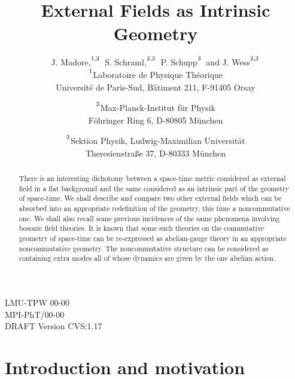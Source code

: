 \documentclass[a4paper,12pt]{article}
\newcommand{\initiate}{\setcounter{equation}{0}}
\begin{document}
 

\title{External Fields as Intrinsic Geometry}

\author{J. Madore,$\strut^{1,2}$\  S. Schraml,$\strut^{2,3}$\ 
        P. Schupp$\strut^{3}$\ and J. Wess$\strut^{2,3}$\\[15pt]
        $\strut^{1}$Laboratoire de Physique Th\'eorique\\
        Universit\'e de Paris-Sud, B\^atiment 211, F-91405 Orsay%
\and    $\strut^{2}$Max-Planck-Institut f\"ur Physik\\
        F\"ohringer Ring 6, D-80805 M\"unchen%
\and    $\strut^{3}$Sektion Physik, Ludwig-Maximilian Universit\"at\\
        Theresienstra\ss e 37, D-80333 M\"unchen}

\date{}

\maketitle

\begin{abstract}
There is an interesting dichotomy between a space-time
metric considered as external field in a flat background and the
same considered as an intrinsic part of the geometry of space-time. 
We shall describe and compare two other external
fields which can be absorbed into an appropriate redefinition of the
geometry, this time a noncommutative one. We shall also recall some
previous incidences of the same phenomena involving bosonic field
theories. It is known that some such theories on the commutative
geometry of space-time can be re-expressed as abelian-gauge theory
in an appropriate noncommutative geometry. The noncommutative
structure can be considered as containing extra modes all of whose
dynamics are given by the one abelian action. 
\end{abstract}

\vfill
\noindent
LMU-TPW 00-00\\
\noindent
MPI-PhT/00-00\\
\noindent
DRAFT Version CVS:1.17
\newpage



\initiate
\section{Introduction and motivation}
\end{document}
